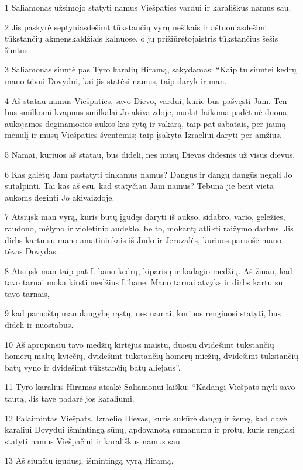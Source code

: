 \par 1 Saliamonas užsimojo statyti namus Viešpaties vardui ir karališkus namus sau. 
\par 2 Jis paskyrė septyniasdešimt tūkstančių vyrų nešikais ir aštuoniasdešimt tūkstančių akmenskaldžiais kalnuose, o jų prižiūrėtojais­tris tūkstančius šešis šimtus. 
\par 3 Saliamonas siuntė pas Tyro karalių Hiramą, sakydamas: “Kaip tu siuntei kedrų mano tėvui Dovydui, kai jis statėsi namus, taip daryk ir man. 
\par 4 Aš statau namus Viešpaties, savo Dievo, vardui, kurie bus pašvęsti Jam. Ten bus smilkomi kvapnūs smilkalai Jo akivaizdoje, nuolat laikoma padėtinė duona, aukojamos deginamosios aukos kas rytą ir vakarą, taip pat sabatais, per jauną mėnulį ir mūsų Viešpaties šventėmis; taip įsakyta Izraeliui daryti per amžius. 
\par 5 Namai, kuriuos aš statau, bus dideli, nes mūsų Dievas didesnis už visus dievus. 
\par 6 Kas galėtų Jam pastatyti tinkamus namus? Dangus ir dangų dangūs negali Jo sutalpinti. Tai kas aš esu, kad statyčiau Jam namus? Tebūna jie bent vieta aukoms deginti Jo akivaizdoje. 
\par 7 Atsiųsk man vyrą, kuris būtų įgudęs daryti iš aukso, sidabro, vario, geležies, raudono, mėlyno ir violetinio audeklo, be to, mokantį atlikti raižymo darbus. Jis dirbs kartu su mano amatininkais iš Judo ir Jeruzalės, kuriuos paruošė mano tėvas Dovydas. 
\par 8 Atsiųsk man taip pat Libano kedrų, kiparisų ir kadagio medžių. Aš žinau, kad tavo tarnai moka kirsti medžius Libane. Mano tarnai atvyks ir dirbs kartu su tavo tarnais, 
\par 9 kad paruoštų man daugybę rąstų, nes namai, kuriuos rengiuosi statyti, bus dideli ir nuostabūs. 
\par 10 Aš aprūpinsiu tavo medžių kirtėjus maistu, duosiu dvidešimt tūkstančių homerų maltų kviečių, dvidešimt tūkstančių homerų miežių, dvidešimt tūkstančių batų vyno ir dvidešimt tūkstančių batų aliejaus”. 
\par 11 Tyro karalius Hiramas atsakė Saliamonui laišku: “Kadangi Viešpats myli savo tautą, Jis tave padarė jos karaliumi. 
\par 12 Palaimintas Viešpats, Izraelio Dievas, kuris sukūrė dangų ir žemę, kad davė karaliui Dovydui išmintingą sūnų, apdovanotą sumanumu ir protu, kuris rengiasi statyti namus Viešpačiui ir karališkus namus sau. 
\par 13 Aš siunčiu įgudusį, išmintingą vyrą Hiramą, 
